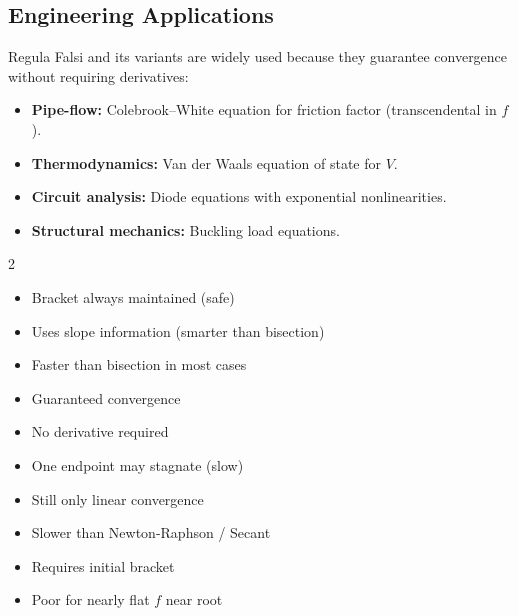 \documentclass[12pt]{article}
\begin{document}
\subsection*{Engineering Applications}

Regula Falsi and its variants are widely used because they guarantee convergence without requiring derivatives:
\begin{itemize}[noitemsep]
  \item \textbf{Pipe-flow:} Colebrook--White equation for friction factor (transcendental in $f$).
  \item \textbf{Thermodynamics:} Van der Waals equation of state for $V$.
  \item \textbf{Circuit analysis:} Diode equations with exponential nonlinearities.
  \item \textbf{Structural mechanics:} Buckling load equations.
\end{itemize}

\bigskip

\begin{multicols}{2}
\begin{prosbox}
\begin{itemize}[noitemsep]
  \item Bracket always maintained (safe)
  \item Uses slope information (smarter than bisection)
  \item Faster than bisection in most cases
  \item Guaranteed convergence
  \item No derivative required
\end{itemize}
\end{prosbox}

\columnbreak

\begin{consbox}
\begin{itemize}[noitemsep]
  \item One endpoint may stagnate (slow)
  \item Still only linear convergence
  \item Slower than Newton-Raphson / Secant
  \item Requires initial bracket
  \item Poor for nearly flat $f$ near root
\end{itemize}
\end{consbox}
\end{multicols}

\newpage
\end{document}
